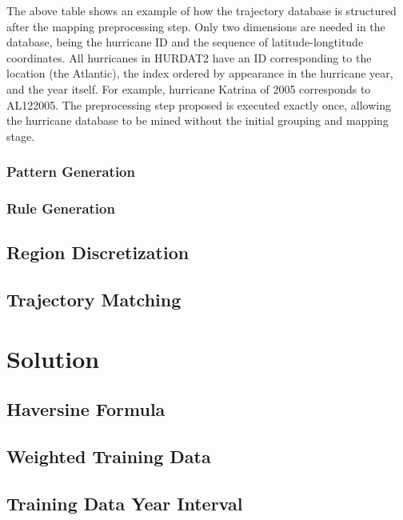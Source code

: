 \documentclass[12pt,conference]{IEEEtran}
\begin{document}
The above table shows an example of how the trajectory database is structured after the mapping preprocessing step. Only two dimensions are needed in the database, being the hurricane ID and the sequence of latitude-longtitude coordinates. All hurricanes in HURDAT2 have an ID corresponding to the location (the Atlantic), the index ordered by appearance in the hurricane year, and the year itself. For example, hurricane Katrina of 2005 corresponds to AL122005. The preprocessing step proposed is executed exactly once, allowing the hurricane database to be mined without the initial grouping and mapping stage.

\subsubsection{Pattern Generation}

\subsubsection{Rule Generation}



\subsection{Region Discretization}


\subsection{Trajectory Matching}

\section{Solution}

\subsection{Haversine Formula}

\subsection{Weighted Training Data}

\subsection{Training Data Year Interval}
\end{document}
